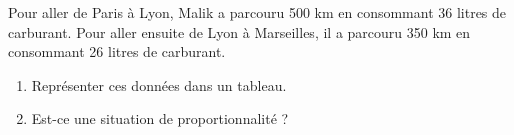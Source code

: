 \documentclass[exercice]{thedocument}%
\begin{document}
%
Pour aller de Paris à Lyon, Malik a parcouru 500 km en consommant 36 litres de
carburant. Pour aller ensuite de Lyon à Marseilles, il a parcouru 350 km en
consommant 26 litres de carburant.
\begin{enumerate}
    \item Représenter ces données dans un tableau.
    \item Est-ce une situation de proportionnalité ?
\end{enumerate}
\end{document}
